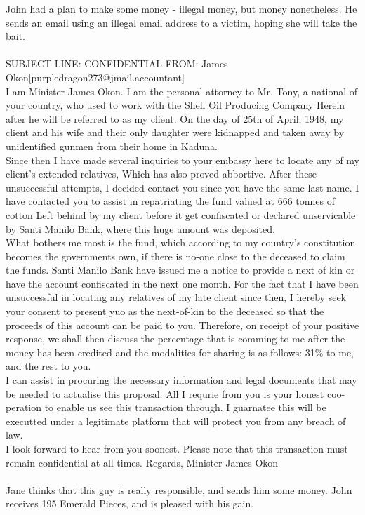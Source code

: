 \documentclass{article}
\begin{document}
John had a plan to make some money {-} illegal money, but money nonetheless.
He sends an email using an illegal email address to a victim, hoping she will take the bait.
\\\\
SUBJECT LINE: CONFIDENTIAL
FROM: James Okon[purpledragon273@jmail.accountant]
\\
I am Minister James Okon.
I am the personal attorney to Mr. Tony, a national of your country, who used to work with the Shell Oil Producing Company
Herein after he will be referred to as my client.
On the day of 25th of April, 1948, my client and his wife and their only daughter were kidnapped and taken away by unidentified gunmen from their home in Kaduna.
\\
Since then I have made several inquiries to your embassy here to locate any of my client's extended relatives, Which has also proved abbortive.
After these unsuccessful attempts, I decided contact you since you have the same last name.
I have contacted you to assist in repatriating the fund valued at 666 tonnes of cotton Left behind by my client before it get confiscated or declared unservicable by Santi Manilo Bank, where this huge amount was deposited.
\\
What bothers me most is the fund, which according to my country's constitution becomes the governments own, if there is no{-}one close to the deceased to claim the funds.
Santi Manilo Bank have issued me a notice to provide a next of kin or have the account confiscated in the next one month.
For the fact that I have been unsuccessful in locating any relatives of my late client since then, I hereby seek your consent to present yuo as the next{-}of{-}kin to the deceased so that the proceeds of this account can be paid to you.
Therefore, on receipt of your positive response, we shall then discuss the percentage that is comming to me after the money has been credited and the modalities for sharing is as follows: 31\% to me, and the rest to you.
\\
I can assist in procuring the necessary information and legal documents that may be needed to actualise this proposal.
All I requrie from you is your honest coo{-}peration to enable us see this transaction through.
I guarnatee this will be executted under a legitimate platform that will protect you from any breach of law.
\\
I look forward to hear from you soonest.
Please note that this transaction must remain confidential at all times.
Regards, Minister James Okon
\\\\
Jane thinks that this guy is really responsible, and sends him some money.
John receives 195 Emerald Pieces, and is pleased with his gain.
\end{document}
